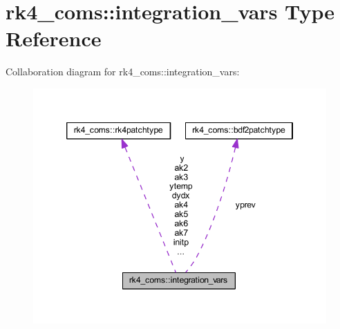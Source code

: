 \hypertarget{structrk4__coms_1_1integration__vars}{}\section{rk4\+\_\+coms\+:\+:integration\+\_\+vars Type Reference}
\label{structrk4__coms_1_1integration__vars}


Collaboration diagram for rk4\+\_\+coms\+:\+:integration\+\_\+vars\+:\nopagebreak
\begin{figure}[H]
\begin{center}
\leavevmode
\includegraphics[width=346pt]{structrk4__coms_1_1integration__vars__coll__graph}
\end{center}
\end{figure}
